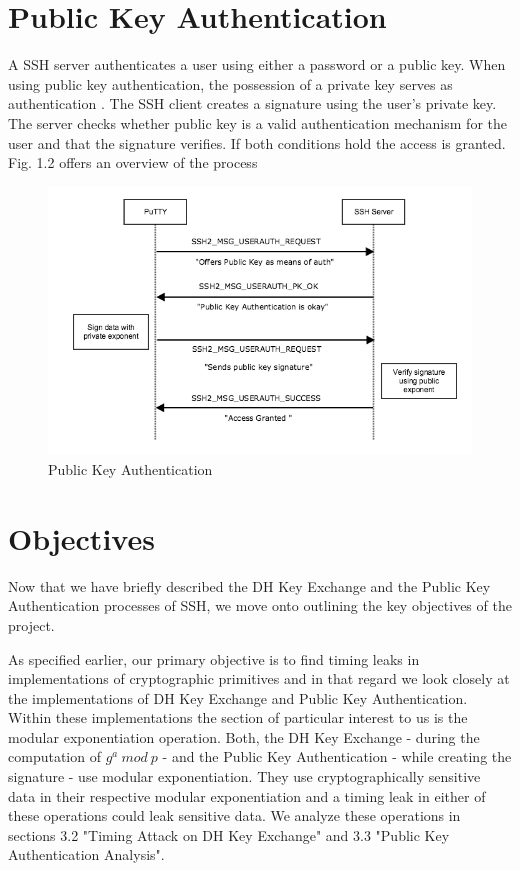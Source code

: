 \documentclass{bhamthesis}
\begin{document}
\section{Public Key Authentication}
A SSH server authenticates a user using either a password or a public key. When using public key authentication, the possession of a private key serves as authentication \cite{rfc4252}. The SSH client creates a signature using the user's private key. The server checks whether public key is a valid authentication mechanism for the user and that the signature verifies. If both conditions hold the access is granted. Fig. 1.2 offers an overview of the process\par
\begin{figure}[ht]
\caption{Public Key Authentication}
\centering
\includegraphics[width=1\textwidth]{SSH_PK_AUTH.png}
\end{figure}
\section{Objectives}
\par
Now that we have briefly described the DH Key Exchange and the Public Key Authentication processes of SSH, we move onto outlining the key objectives of the project.\par
As specified earlier, our primary objective is to find timing leaks in implementations of cryptographic primitives and in that regard we look closely at the implementations of DH Key Exchange and Public Key Authentication. Within these implementations the section of particular interest to us is the modular exponentiation operation. Both, the DH Key Exchange - during the computation of \(g^a\ mod\ p\) - and the Public Key Authentication - while creating the signature - use modular exponentiation. They use cryptographically sensitive data in their respective modular exponentiation and a timing leak in either of these operations could leak sensitive data. We analyze these operations in sections 3.2 "Timing Attack on DH Key Exchange" and 3.3 "Public Key Authentication Analysis".\par
\end{document}
